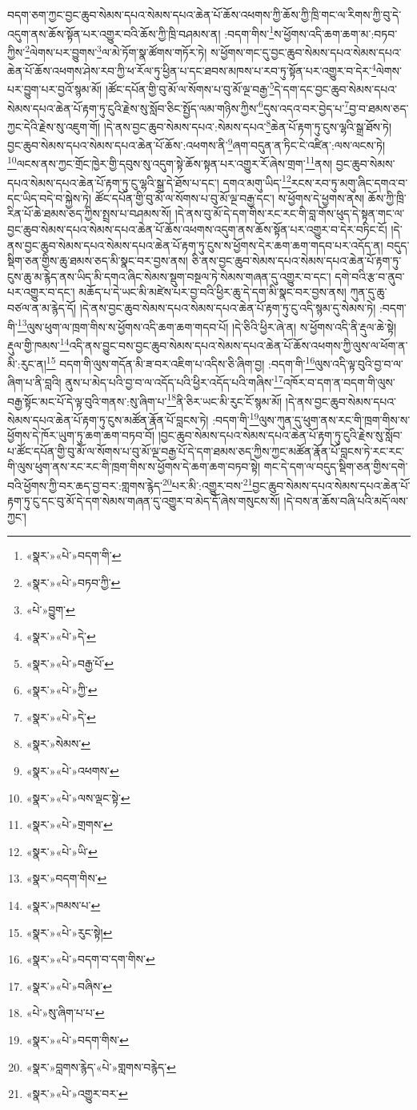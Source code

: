 བདག་ཅག་ཀྱང་བྱང་ཆུབ་སེམས་དཔའ་སེམས་དཔའ་ཆེན་པོ་ཆོས་འཕགས་ཀྱི་ཆོས་ཀྱི་ཁྲི་གང་ལ་རིགས་ཀྱི་བུ་དེ་འདུག་ནས་ཆོས་སྟོན་པར་འགྱུར་བའི་ཆོས་ཀྱི་ཁྲི་བཤམས་ན། :བདག་གིས་\footnote{«སྣར་»«པེ་»བདག་གི་}ས་ཕྱོགས་འདི་ཆག་ཆག་མ་:བཏབ་ཀྱིས་\footnote{«སྣར་»«པེ་»བཏབ་ཀྱི་}ལེགས་པར་བྱུགས་\footnote{«པེ་»བྱུག་}ལ་མེ་ཏོག་སྣ་ཚོགས་གཏོར་ཏེ། ས་ཕྱོགས་གང་དུ་བྱང་ཆུབ་སེམས་དཔའ་སེམས་དཔའ་ཆེན་པོ་ཆོས་འཕགས་ཤེས་རབ་ཀྱི་ཕ་རོལ་ཏུ་ཕྱིན་པ་དང་ཐབས་མཁས་པ་རབ་ཏུ་སྟོན་པར་འགྱུར་བ་དེར་\footnote{«སྣར་»«པེ་»དེ་}ལེགས་པར་བྱུག་པར་བྱའོ་སྙམ་མོ། །ཚོང་དཔོན་གྱི་བུ་མོ་ལ་སོགས་པ་བུ་མོ་ལྔ་བརྒྱ་\footnote{«སྣར་»«པེ་»བརྒྱ་པོ་}དེ་དག་དང་བྱང་ཆུབ་སེམས་དཔའ་སེམས་དཔའ་ཆེན་པོ་རྟག་ཏུ་ངུའི་རྗེས་སུ་སློབ་ཅིང་སྤྱོད་ལམ་གཉིས་ཀྱིས་\footnote{«སྣར་»«པེ་»ཀྱི་}དུས་འདའ་བར་བྱེད་པ་\footnote{«སྣར་»«པེ་»དེ་}བྱ་བ་ཐམས་ཅད་ཀྱང་དེའི་རྗེས་སུ་འཇུག་གོ། །དེ་ནས་བྱང་ཆུབ་སེམས་དཔའ་:སེམས་དཔའ་\footnote{«སྣར་»སེམས་}ཆེན་པོ་རྟག་ཏུ་ངུས་ལྷའི་སྒྲ་ཐོས་ཏེ། བྱང་ཆུབ་སེམས་དཔའ་སེམས་དཔའ་ཆེན་པོ་ཆོས་:འཕགས་ནི་\footnote{«སྣར་»«པེ་»འཕགས་}ཞག་བདུན་ན་ཏིང་ངེ་འཛིན་:ལས་ལངས་ཏེ། \footnote{«སྣར་»«པེ་»ལས་ལྡང་སྟེ་}ལངས་ནས་ཀྱང་གྲོང་ཁྱེར་གྱི་དབུས་སུ་འདུག་སྟེ་ཆོས་སྟན་པར་འགྱུར་རོ་ཞེས་གྲག་\footnote{«སྣར་»«པེ་»གྲགས་}ནས། བྱང་ཆུབ་སེམས་དཔའ་སེམས་དཔའ་ཆེན་པོ་རྟག་ཏུ་ངུ་ལྷའི་སྒྲ་དེ་ཐོས་པ་དང་། དགའ་མགུ་ཡིད་\footnote{«སྣར་»«པེ་»ཡི་}རངས་རབ་ཏུ་མགུ་ཞིང་དགའ་བ་དང་ཡིད་བདེ་བ་སྐྱེས་ཏེ། ཚོང་དཔོན་གྱི་བུ་མོ་ལ་སོགས་པ་བུ་མོ་ལྔ་བརྒྱ་དང་། ས་ཕྱོགས་དེ་ཕྱགས་ནས། ཆོས་ཀྱི་ཁྲི་རིན་པོ་ཆེ་ཐམས་ཅད་ཀྱིས་སྤྲས་པ་བཤམས་སོ། །དེ་ནས་བུ་མོ་དེ་དག་གིས་རང་རང་གི་བླ་གོས་ཕུད་དེ་སྟན་གང་ལ་བྱང་ཆུབ་སེམས་དཔའ་སེམས་དཔའ་ཆེན་པོ་ཆོས་འཕགས་འདུག་ནས་ཆོས་སྟོན་པར་འགྱུར་བ་དེར་བཏིང་ངོ། །དེ་ནས་བྱང་ཆུབ་སེམས་དཔའ་སེམས་དཔའ་ཆེན་པོ་རྟག་ཏུ་ངུས་ས་ཕྱོགས་དེར་ཆག་ཆག་གདབ་པར་འདོད་ན། བདུད་སྡིག་ཅན་གྱིས་ཆུ་ཐམས་ཅད་མི་སྣང་བར་བྱས་ནས། ཅི་ནས་བྱང་ཆུབ་སེམས་དཔའ་སེམས་དཔའ་ཆེན་པོ་རྟག་ཏུ་ངུས་ཆུ་མ་རྙེད་ནས་ཡིད་མི་དགའ་ཞིང་སེམས་སྡུག་བསྔལ་ཏེ་སེམས་གཞན་དུ་འགྱུར་བ་དང་། དགེ་བའི་རྩ་བ་ནུབ་པར་འགྱུར་བ་དང་། མཆོད་པ་དེ་ཡང་མི་མཛེས་པར་བྱ་བའི་ཕྱིར་ཆུ་དེ་དག་མི་སྣང་བར་བྱས་ནས། ཀུན་དུ་ཆུ་བཙལ་ན་མ་རྙེད་དོ། །དེ་ནས་བྱང་ཆུབ་སེམས་དཔའ་སེམས་དཔའ་ཆེན་པོ་རྟག་ཏུ་ངུ་འདི་སྙམ་དུ་སེམས་ཏེ། :བདག་གི་\footnote{«སྣར་»བདག་གིས་}ལུས་ཕུག་ལ་ཁྲག་གིས་ས་ཕྱོགས་འདི་ཆག་ཆག་གདབ་པོ། །དེ་ཅིའི་ཕྱིར་ཞེ་ན། ས་ཕྱོགས་འདི་ནི་རྡུལ་ཆེ་སྟེ། རྡུལ་གྱི་ཁམས་\footnote{«སྣར་»ཁམས་པ་}འདི་ནས་བྱུང་བས་བྱང་ཆུབ་སེམས་དཔའ་སེམས་དཔའ་ཆེན་པོ་ཆོས་འཕགས་ཀྱི་ལུས་ལ་ཕོག་ན་མི་:རུང་ན།\footnote{«སྣར་»«པེ་»རུང་སྟེ།} བདག་གི་ལུས་གདོན་མི་ཟ་བར་འཇིག་པ་འདིས་ཅི་ཞིག་བྱ། :བདག་གི་\footnote{«སྣར་»«པེ་»བདག་བ་དག་གིས་}ལུས་འདི་ལྟ་བུའི་བྱ་བ་ལ་ཞིག་པ་ནི་བླའི། ནུས་པ་མེད་པའི་བྱ་བ་ལ་འདོད་པའི་ཕྱིར་འདོད་པའི་གཞིས་\footnote{«སྣར་»«པེ་»བཞིས་}འཁོར་བ་དག་ན་བདག་གི་ལུས་བརྒྱ་སྟོང་མང་པོ་དེ་ལྟ་བུའི་གནས་:སུ་ཞིག་པ་\footnote{«པེ་»སུ་ཞིག་པ་པ་}ནི་ཅིར་ཡང་མི་རུང་ངོ་སྙམ་མོ། །དེ་ནས་བྱང་ཆུབ་སེམས་དཔའ་སེམས་དཔའ་ཆེན་པོ་རྟག་ཏུ་ངུས་མཚོན་རྣོན་པོ་བླངས་ཏེ། :བདག་གི་\footnote{«སྣར་»«པེ་»བདག་གིས་}ལུས་ཀུན་དུ་ཕུག་ནས་རང་གི་ཁྲག་གིས་ས་ཕྱོགས་དེ་ཁོར་ཡུག་ཏུ་ཆག་ཆག་བཏབ་བོ། །བྱང་ཆུབ་སེམས་དཔའ་སེམས་དཔའ་ཆེན་པོ་རྟག་ཏུ་ངུའི་རྗེས་སུ་སློབ་པ་ཚོང་དཔོན་གྱི་བུ་མོ་ལ་སོགས་པ་བུ་མོ་ལྔ་བརྒྱ་པོ་དེ་དག་ཐམས་ཅད་ཀྱིས་ཀྱང་མཚོན་རྣོན་པོ་བླངས་ཏེ་རང་རང་གི་ལུས་ཕུག་ནས་རང་རང་གི་ཁྲག་གིས་ས་ཕྱོགས་དེ་ཆག་ཆག་བཏབ་སྟེ། གང་དེ་དག་ལ་བདུད་སྡིག་ཅན་གྱིས་དགེ་བའི་ཕྱོགས་ཀྱི་བར་ཆད་བྱ་བར་:གླགས་རྙེད་\footnote{«སྣར་»བླགས་རྙེད་«པེ་»གླགས་བརྙེད་}པར་མི་:འགྱུར་བས་\footnote{«སྣར་»«པེ་»འགྱུར་བར་}བྱང་ཆུབ་སེམས་དཔའ་སེམས་དཔའ་ཆེན་པོ་རྟག་ཏུ་ངུ་དང་བུ་མོ་དེ་དག་སེམས་གཞན་དུ་འགྱུར་བ་མེད་དོ་ཞེས་གསུངས་སོ། །དེ་བས་ན་ཆོས་བཞི་པའི་མདོ་ལས་ཀྱང་། 